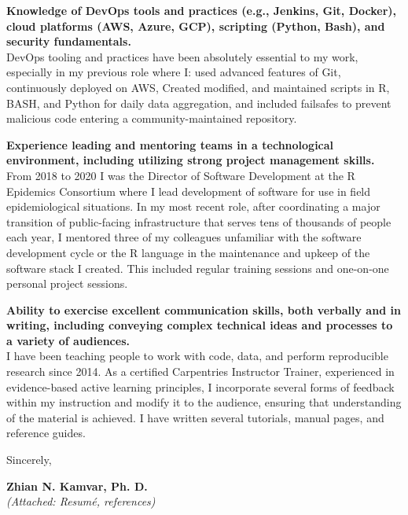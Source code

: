 \vspace{2ex}

\textbf{Knowledge of DevOps tools and practices (e.g., Jenkins, Git, Docker), cloud platforms (AWS, Azure, GCP), scripting (Python, Bash), and security fundamentals.}\\
DevOps tooling and practices have been absolutely essential to my work,
especially in my previous role where I: used advanced features of Git,
continuously deployed on AWS, Created modified, and maintained scripts in R,
BASH, and Python for daily data aggregation, and included failsafes to prevent
malicious code entering a community-maintained repository. 


\vspace{2ex}

\textbf{Experience leading and mentoring teams in a technological environment, including utilizing strong project management skills.}\\
From 2018 to 2020 I was the Director of Software Development at the R Epidemics Consortium where I lead development of software for use in field epidemiological situations. In my most recent role, after coordinating a major transition of public-facing infrastructure that serves tens of thousands of people each year, I mentored
three of my colleagues unfamiliar with the software development cycle or the R language in the maintenance and upkeep of the software stack I created. This included regular training sessions and one-on-one personal project sessions. 

\vspace{2ex}

\textbf{Ability to exercise excellent communication skills, both verbally and in writing, including conveying complex technical ideas and processes to a variety of audiences.}\\
I have been teaching people to work with code, data, and perform
reproducible research since 2014. As a certified Carpentries Instructor
Trainer, experienced in evidence-based active learning principles, I incorporate several forms of feedback within my instruction and modify it to the audience, ensuring that understanding of the material is achieved. I have written several tutorials, manual pages, and reference guides.

\vspace{3ex}

Sincerely,

\vspace{4ex}

\textbf{Zhian N. Kamvar, Ph. D.}\\
{\footnotesize \textit{(Attached: Resum\'{e}, references)}}

\clearpage



